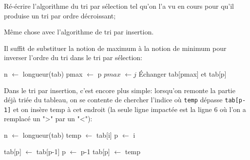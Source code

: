 \documentclass[12pt]{article}
\begin{document}
	\begin{MonExo}
		\begin{alphenum}
			\item Ré-écrire l'algorithme du tri par sélection tel qu'on l'a vu en cours pour qu'il produise un tri par ordre décroissant;
			\item Même chose avec l'algorithme de tri par insertion.
		\end{alphenum}
	\end{MonExo}
	\begin{MaReponse}
		\begin{alphenum}
			\item Il suffit de substituer la notion de maximum à la notion de minimum pour inverser l'ordre du tri dans le tri par sélection:
			\begin{algorithmic}[1]
				\State n $\leftarrow$ longueur(tab)
				\State pmax $\leftarrow$ p
				\State $pmax$ $\leftarrow j$
				\EndIf
				\EndFor
				\State Échanger tab[pmax] et tab[p]
				\EndFor
				\State{}
				\EndFunction
			\end{algorithmic}
			
			\item Dans le tri par insertion, c'est encore plus simple: lorsqu'on remonte la partie déjà triée du tableau, on se contente de chercher l'indice où \texttt{temp} dépasse \texttt{tab[p-1]} et on insère temp à cet endroit (la seule ligne impactée est la ligne 6 où l'on a remplacé un ">" par un "<"):
			\begin{algorithmic}[1]
				\State n $\leftarrow$ longueur(tab)
				\State temp $\leftarrow$ tab[i]
				\State p $\leftarrow$ i
				
				\State tab[p] $\leftarrow$ tab[p-1]
				\State p $\leftarrow$ p-1
				\EndWhile
				\State tab[p] $\leftarrow$ temp
				\EndFor
				\State{}
				\EndFunction
			\end{algorithmic}
		\end{alphenum}
	\end{MaReponse}
	
\end{document}
